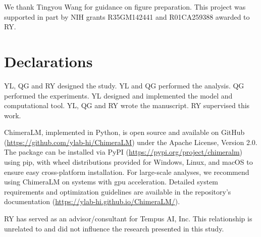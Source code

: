 \documentclass[pdflatex,sn-nature,lineno]{sn-jnl}%
\theoremstyle{thmstyleone}%
\theoremstyle{thmstyletwo}%
\theoremstyle{thmstylethree}%
\begin{document}

We thank Tingyou Wang for guidance on figure preparation.
This project was supported in part by NIH grants R35GM142441 and R01CA259388 awarded to RY.

\section*{Declarations}


YL, QG and RY designed the study.
YL and QG performed the analysis.
QG performed the experiments.
YL designed and implemented the model and computational tool.
YL, QG and RY wrote the manuscript.
RY supervised this work.




ChimeraLM, implemented in Python, is open source and available on GitHub (\url{https://github.com/ylab-hi/ChimeraLM}) under the Apache License, Version 2.0.
The package can be installed via PyPI (\url{https://pypi.org/project/chimeralm}) using pip, with wheel distributions provided for Windows, Linux, and macOS to ensure easy cross-platform installation.
For large-scale analyses, we recommend using ChimeraLM on systems with \gls{gpu} acceleration. Detailed system requirements and optimization guidelines are available in the repository's documentation (\url{https://ylab-hi.github.io/ChimeraLM/}).


RY has served as an advisor/consultant for Tempus AI, Inc. This relationship is unrelated to and did not influence the research presented in this study.


%
\end{document}

